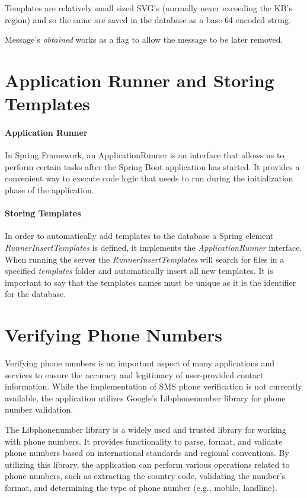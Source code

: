 Templates are relatively small sized SVG's (normally never exceeding the KB's region) and so the same are saved in the database as a base 64 encoded string.

Message's \textit{ obtained } works as a flag to allow the message to be later removed.   

\section{Application Runner and Storing Templates}

\paragraph{Application Runner}
In Spring Framework, an ApplicationRunner is an interface that allows us to perform certain tasks after the Spring Boot application has started. It provides a convenient way to execute code logic that needs to run during the initialization phase of the application.

\paragraph{Storing Templates}
In order to automatically add templates to the database a Spring element \textit{ RunnerInsertTemplates } is defined, it implements the \textit{ ApplicationRunner } interface. When running the server the \textit{ RunnerInsertTemplates } will search for files in a specified \textit{templates} folder and automatically insert all new templates.
It is important to say that the templates names must be unique as it is the identifier for the database.

\section{Verifying Phone Numbers}
Verifying phone numbers is an important aspect of many applications and services to ensure the accuracy and legitimacy of user-provided contact information. While the implementation of SMS phone verification is not currently available, the application utilizes Google's Libphonenumber library for phone number validation.

The Libphonenumber library is a widely used and trusted library for working with phone numbers. It provides functionality to parse, format, and validate phone numbers based on international standards and regional conventions. By utilizing this library, the application can perform various operations related to phone numbers, such as extracting the country code, validating the number's format, and determining the type of phone number (e.g., mobile, landline).

